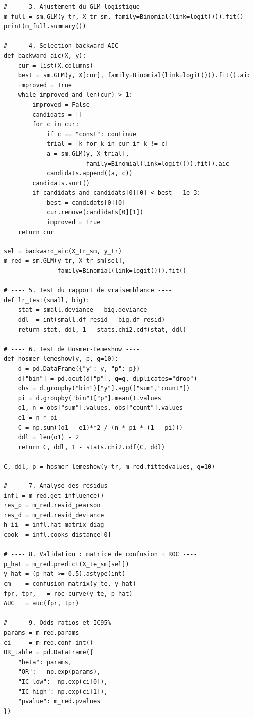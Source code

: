 \documentclass[11pt,a4paper,twoside]{report}
\theoremstyle{definition}
\begin{document}
\begin{lstlisting}[caption={Pipeline complet d'analyse par GLM logistique},label={lst:analysis}]
# ---- 3. Ajustement du GLM logistique ----
m_full = sm.GLM(y_tr, X_tr_sm, family=Binomial(link=logit())).fit()
print(m_full.summary())

# ---- 4. Selection backward AIC ----
def backward_aic(X, y):
    cur = list(X.columns)
    best = sm.GLM(y, X[cur], family=Binomial(link=logit())).fit().aic
    improved = True
    while improved and len(cur) > 1:
        improved = False
        candidats = []
        for c in cur:
            if c == "const": continue
            trial = [k for k in cur if k != c]
            a = sm.GLM(y, X[trial],
                       family=Binomial(link=logit())).fit().aic
            candidats.append((a, c))
        candidats.sort()
        if candidats and candidats[0][0] < best - 1e-3:
            best = candidats[0][0]
            cur.remove(candidats[0][1])
            improved = True
    return cur

sel = backward_aic(X_tr_sm, y_tr)
m_red = sm.GLM(y_tr, X_tr_sm[sel],
               family=Binomial(link=logit())).fit()

# ---- 5. Test du rapport de vraisemblance ----
def lr_test(small, big):
    stat = small.deviance - big.deviance
    ddl  = int(small.df_resid - big.df_resid)
    return stat, ddl, 1 - stats.chi2.cdf(stat, ddl)

# ---- 6. Test de Hosmer-Lemeshow ----
def hosmer_lemeshow(y, p, g=10):
    d = pd.DataFrame({"y": y, "p": p})
    d["bin"] = pd.qcut(d["p"], q=g, duplicates="drop")
    obs = d.groupby("bin")["y"].agg(["sum","count"])
    pi = d.groupby("bin")["p"].mean().values
    o1, n = obs["sum"].values, obs["count"].values
    e1 = n * pi
    C = np.sum((o1 - e1)**2 / (n * pi * (1 - pi)))
    ddl = len(o1) - 2
    return C, ddl, 1 - stats.chi2.cdf(C, ddl)

C, ddl, p = hosmer_lemeshow(y_tr, m_red.fittedvalues, g=10)

# ---- 7. Analyse des residus ----
infl = m_red.get_influence()
res_p = m_red.resid_pearson
res_d = m_red.resid_deviance
h_ii  = infl.hat_matrix_diag
cook  = infl.cooks_distance[0]

# ---- 8. Validation : matrice de confusion + ROC ----
p_hat = m_red.predict(X_te_sm[sel])
y_hat = (p_hat >= 0.5).astype(int)
cm    = confusion_matrix(y_te, y_hat)
fpr, tpr, _ = roc_curve(y_te, p_hat)
AUC   = auc(fpr, tpr)

# ---- 9. Odds ratios et IC95% ----
params = m_red.params
ci     = m_red.conf_int()
OR_table = pd.DataFrame({
    "beta": params,
    "OR":   np.exp(params),
    "IC_low":  np.exp(ci[0]),
    "IC_high": np.exp(ci[1]),
    "pvalue": m_red.pvalues
})
\end{lstlisting}
\end{document}
